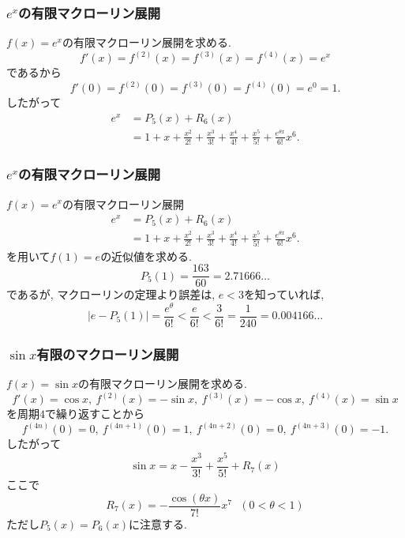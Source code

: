 \begin{frame}
\frametitle{$e^x$の有限マクローリン展開}

$f(x)=e^x$の有限マクローリン展開を求める. 
$$
f'(x)=f^{(2)}(x)=f^{(3)}(x)=f^{(4)}(x)=e^x
$$
であるから
$$
f'(0)=f^{(2)}(0)=f^{(3)}(0)=f^{(4)}(0)=e^0=1. 
$$
したがって
\begin{align*}
e^x &= P_5(x)+R_6(x) \\
& = 1+x+\frac{x^2}{2!}+\frac{x^3}{3!}+\frac{x^4}{4!}+\frac{x^5}{5!}+\frac{e^{\theta x}}{6!}x^6. 
\end{align*}

\end{frame}






\begin{frame}
\frametitle{$e^x$の有限マクローリン展開}

$f(x)=e^x$の有限マクローリン展開
\begin{align*}
e^x &= P_5(x)+R_6(x) \\
& = 1+x+\frac{x^2}{2!}+\frac{x^3}{3!}+\frac{x^4}{4!}+\frac{x^5}{5!}+\frac{e^{\theta x}}{6!}x^6. 
\end{align*}
を用いて$f(1)=e$の近似値を求める. 
$$
P_5(1)=\frac{163}{60}=2.71666\dots
$$
であるが, マクローリンの定理より誤差は, $e<3$を知っていれば, 
$$
|e-P_5(1)|=\frac{e^\theta}{6!}<\frac{e}{6!}<\frac{3}{6!}=\frac{1}{240}=0.004166\dots
$$

\end{frame}






\begin{frame}
\frametitle{$\sin x$有限のマクローリン展開}

$f(x)=\sin x$の有限マクローリン展開を求める. 
$$
f'(x)=\cos x, \ f^{(2)}(x)=-\sin x, \ f^{(3)}(x)=-\cos x, \ f^{(4)}(x)=\sin x
$$
を周期$4$で繰り返すことから
$$
 f^{(4n)}(0)=0, \ f^{(4n+1)}(0)=1, \ f^{(4n+2)}(0)=0, \ f^{(4n+3)}(0)=-1. 
$$
したがって
$$
\sin x =x-\frac{x^3}{3!}+\frac{x^5}{5!}+R_7(x)
$$
ここで
$$
R_7(x)=- \frac{\cos (\theta x)}{7!}x^7 \ \ \ (0 < \theta <1)
$$
ただし$P_5(x)=P_6(x)$に注意する. 
\end{frame}


